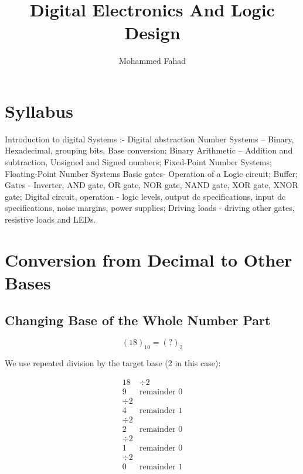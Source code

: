 \documentclass{article}
\title{Digital Electronics And Logic Design}
\author{Mohammed Fahad}
\begin{document}
\maketitle

\section*{Syllabus}

Introduction to digital Systems :- Digital abstraction
Number Systems – Binary, Hexadecimal, grouping bits, Base conversion;
Binary Arithmetic – Addition and subtraction, Unsigned and Signed
numbers; Fixed-Point Number Systems; Floating-Point Number Systems
Basic gates- Operation of a Logic circuit; Buffer; Gates - Inverter, AND gate,
OR gate, NOR gate, NAND gate, XOR gate, XNOR gate; Digital circuit,
operation - logic levels, output dc specifications, input dc specifications,
noise margins, power supplies; Driving loads - driving other gates, resistive
loads and LEDs.

\section{Conversion from Decimal to Other Bases}

\subsection{Changing Base of the Whole Number Part}

\[
(18)_{10} = (?)_2
\]

We use repeated division by the target base (2 in this case):

\begin{equation}
\begin{array}{r|l}
18 & \div 2 \\
\hline
9 & \text{remainder } 0 \\
\div 2 \\
\hline
4 & \text{remainder } 1 \\
\div 2 \\
\hline
2 & \text{remainder } 0 \\
\div 2 \\
\hline
1 & \text{remainder } 0 \\
\div 2 \\
\hline
0 & \text{remainder } 1 \\
\end{array}
\end{equation}
\end{document}
